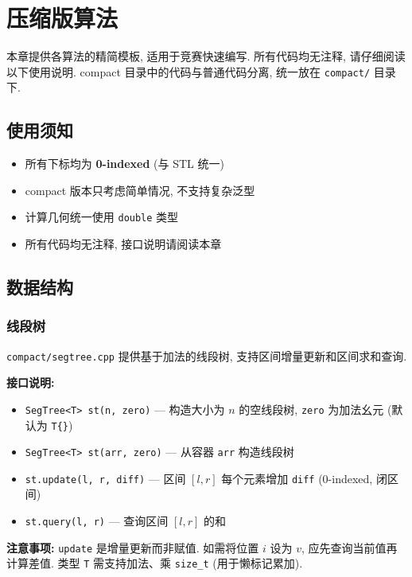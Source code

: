 \documentclass[a4paper]{ctexbook}
\begin{document}


\chapter{压缩版算法}

本章提供各算法的精简模板, 适用于竞赛快速编写. 所有代码均无注释, 请仔细阅读以下使用说明. compact 目录中的代码与普通代码分离, 统一放在 \texttt{compact/} 目录下.

\section{使用须知}

\begin{itemize}
	\item 所有下标均为 \textbf{0-indexed} (与 STL 统一)
	\item compact 版本只考虑简单情况, 不支持复杂泛型
	\item 计算几何统一使用 \texttt{double} 类型
	\item 所有代码均无注释, 接口说明请阅读本章
\end{itemize}

\section{数据结构}

\subsection{线段树}

\texttt{compact/segtree.cpp} 提供基于加法的线段树, 支持区间增量更新和区间求和查询.

\textbf{接口说明:}
\begin{itemize}
	\item \texttt{SegTree<T> st(n, zero)} — 构造大小为 $n$ 的空线段树, \texttt{zero} 为加法幺元 (默认为 \texttt{T\{\}})
	\item \texttt{SegTree<T> st(arr, zero)} — 从容器 \texttt{arr} 构造线段树
	\item \texttt{st.update(l, r, diff)} — 区间 $[l, r]$ 每个元素增加 \texttt{diff} (0-indexed, 闭区间)
	\item \texttt{st.query(l, r)} — 查询区间 $[l, r]$ 的和
\end{itemize}

\textbf{注意事项:} \texttt{update} 是增量更新而非赋值. 如需将位置 $i$ 设为 $v$, 应先查询当前值再计算差值. 类型 \texttt{T} 需支持加法、乘 \texttt{size\_t} (用于懒标记累加).
\end{document}

